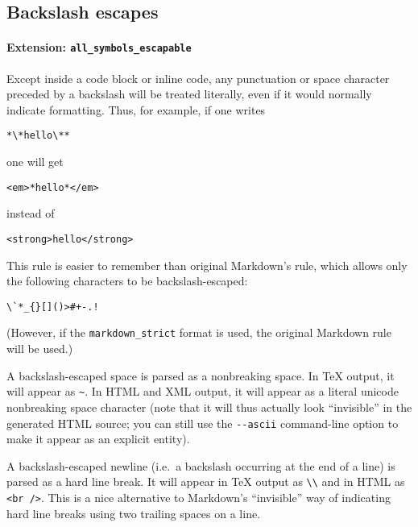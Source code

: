 \documentclass[
]{article}
\begin{document}
\subsection{Backslash escapes}\label{backslash-escapes}

\paragraph{\texorpdfstring{Extension:
\texttt{all\_symbols\_escapable}}{Extension: all\_symbols\_escapable}}\label{extension-all_symbols_escapable}

Except inside a code block or inline code, any punctuation or space
character preceded by a backslash will be treated literally, even if it
would normally indicate formatting. Thus, for example, if one writes

\begin{verbatim}
*\*hello\**
\end{verbatim}

one will get

\begin{verbatim}
<em>*hello*</em>
\end{verbatim}

instead of

\begin{verbatim}
<strong>hello</strong>
\end{verbatim}

This rule is easier to remember than original Markdown's rule, which
allows only the following characters to be backslash-escaped:

\begin{verbatim}
\`*_{}[]()>#+-.!
\end{verbatim}

(However, if the \texttt{markdown\_strict} format is used, the original
Markdown rule will be used.)

A backslash-escaped space is parsed as a nonbreaking space. In TeX
output, it will appear as \texttt{\textasciitilde{}}. In HTML and XML
output, it will appear as a literal unicode nonbreaking space character
(note that it will thus actually look ``invisible'' in the generated
HTML source; you can still use the \texttt{-\/-ascii} command-line
option to make it appear as an explicit entity).

A backslash-escaped newline (i.e.~a backslash occurring at the end of a
line) is parsed as a hard line break. It will appear in TeX output as
\texttt{\textbackslash{}\textbackslash{}} and in HTML as
\texttt{\textless{}br\ /\textgreater{}}. This is a nice alternative to
Markdown's ``invisible'' way of indicating hard line breaks using two
trailing spaces on a line.
\end{document}
